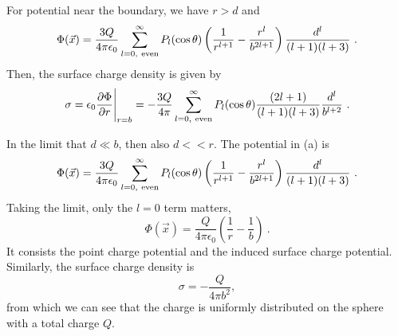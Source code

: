 \documentclass[12pt]{article}
\begin{document}
\newpage
{} For potential near the boundary, we have $r> d$ and
\begin{equation}
    \Phi(\vec x) = \frac{3Q}{4\pi \epsilon_0} \sum_{l= 0,~{\rm even}}^\infty P_l(\cos \theta) \left(\frac{1}{r^{l+1}} - \frac{r^l}{b^{2l+1}}\right) \frac{d^l}{(l+1)(l+3)}~.
\end{equation}
Then, the surface charge density is given by
\begin{align}
    \sigma = \epsilon_0 \frac{\partial \Phi}{\partial r}\Bigg|_{r = b} = - \frac{3Q}{4\pi} \sum_{l = 0, ~{\rm even}}^\infty P_l(\cos\theta) \frac{(2l+1)}{(l+1)(l+3)} \frac{d^l}{b^{l+2}}~.
\end{align}

\newpage
{} In the limit that $d \ll b$, then also $d << r$. The potential in (a) is
\begin{equation}
    \Phi(\vec x) = \frac{3Q}{4\pi \epsilon_0} \sum_{l= 0,~{\rm even}}^\infty P_l(\cos \theta) \left(\frac{1}{r^{l+1}} - \frac{r^l}{b^{2l+1}}\right) \frac{d^l}{(l+1)(l+3)}~.
\end{equation}
Taking the limit, only the $l = 0$ term matters,
\begin{equation}
    \Phi(\vec x) = \frac{Q}{4\pi \epsilon_0} \left(\frac{1}{r} - \frac{1}{b} \right)~.
\end{equation}
It consists the point charge potential and the induced surface charge potential.
Similarly, the surface charge density is
\begin{equation}
    \sigma = -\frac{Q}{4\pi b^2},
\end{equation}
from which we can see that the charge is uniformly distributed on the sphere with a total charge $Q$.
\end{document}

